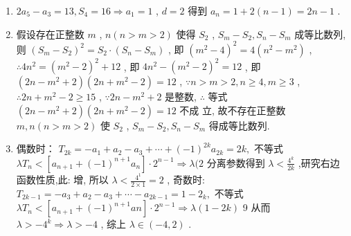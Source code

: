 \begin{enumerate}
    \begin{jieda}
        \begin{enumerate}
            \item $2{a}_{5} - {a}_{3} = {13},{S}_{4} = {16} \Rightarrow  {a}_{1} = 1$ ,
            $d = 2$ 得到 ${a}_{n} = 1 + 2\left( {n - 1}\right)  = {2n} - 1$ .
            \item 假设存在正整数 $m$ , $n\left( {n > m > 2}\right)$ 使得 ${S}_{2}$ ,
            ${S}_{m} - {S}_{2},{S}_{n} - {S}_{m}$ 成等比数列,
            则 ${\left( {S}_{m} - {S}_{2}\right) }^{2} = {S}_{2} \cdot  \left( {{S}_{n} - {S}_{m}}\right)$ ,
            即 ${\left( {m}^{2} - 4\right) }^{2} = 4\left( {{n}^{2} - {m}^{2}}\right)$ ,
            $\therefore 4{n}^{2} = {\left( {m}^{2} - 2\right) }^{2} + {12}$ ,
            即 $4{n}^{2} - {\left( {m}^{2} - 2\right) }^{2} = {12}$ ,
            即 $\left( {{2n} - {m}^{2} + 2}\right) \left( {{2n} + {m}^{2} - 2}\right)  = {12}$ ,
            $\because n > m > 2,n \geq  4,m \geq  3$ ,
            $\therefore {2n} + {m}^{2} - 2 \geq  {15}$ ,
            $\because {2n} - {m}^{2} + 2$ 是整数,
            $\therefore$ 等式 $\left( {{2n} - {m}^{2} + 2}\right) \left( {{2n} + {m}^{2} - 2}\right)  = {12}$ 不成
            立,
            故不存在正整数 $m,n\left( {n > m > 2}\right)$ 使 ${S}_{2}$ ,
            ${S}_{m} - {S}_{2},{S}_{n} - {S}_{m}$ 得成等比数列.
            \item 偶数时：
            ${T}_{2k} =  - {a}_{1} + {a}_{2} - {a}_{3} + \cdots  + {\left( -1\right) }^{2k}{a}_{2k} = {2k},$
            不等式 $\lambda {T}_{n} < \left\lbrack  {{a}_{n + 1} + {\left( -1\right) }^{n + 1}{a}_{n}}\right\rbrack   \cdot  {2}^{n - 1} \Rightarrow  \lambda (2$
            分离参数得到 $\lambda  < \frac{{4}^{k}}{2k}$ ,研究右边函数性质,此:
            增,
            所以 $\lambda  < \frac{{4}^{1}}{2 \times  1} = 2$ ,
            奇数时:
            ${T}_{{2k} - 1} =  - {a}_{3} + {a}_{2} - {a}_{3} + \cdots  - {a}_{{2k} - 1} = 1 - {2}_{k},$
            不等式
            $\lambda {T}_{n} < \left\lbrack  {{a}_{n + 1} + {\left( -1\right) }^{n + 1}{an}}\right\rbrack   \cdot  {2}^{n - 1} \Rightarrow  \lambda \left( {1 - {2k}}\right)$
            9
            从而 $\lambda  >  - {4}^{k} \Rightarrow  \lambda  >  - 4$ ,
            综上 $\lambda  \in  \left( -4,2\right)$ .
        \end{enumerate}
    \end{jieda}
\end{enumerate}
